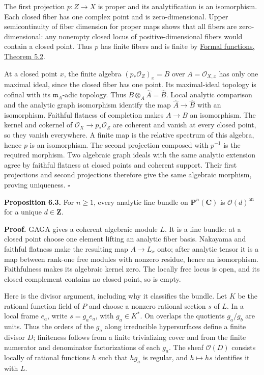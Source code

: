 \documentclass[11pt]{article}
\begin{document}
The first projection \(p:Z\to X\) is proper and its analytification is
an isomorphism. Each closed fiber has one complex point and is
zero-dimensional. Upper semicontinuity of fiber dimension for proper
maps shows that all fibers are zero-dimensional: any nonempty closed
locus of positive-dimensional fibers would contain a closed point. Thus
\(p\) has finite fibers and is finite by
\href{the-theorem-on-formal-functions.html\#5-dimension-and-finiteness-consequences}{Formal
functions, Theorem 5.2}.

At a closed point \(x\), the finite algebra \((p_*\mathcal O_Z)_x=B\)
over \(A=\mathcal O_{X,x}\) has only one maximal ideal, since the closed
fiber has one point. Its maximal-ideal topology is cofinal with its
\(\mathfrak m_A\)-adic topology. Thus
\(B\otimes_A\widehat A=\widehat B\). Local analytic comparison and the
analytic graph isomorphism identify the map \(\widehat A\to\widehat B\)
with an isomorphism. Faithful flatness of completion makes \(A\to B\) an
isomorphism. The kernel and cokernel of
\(\mathcal O_X\to p_*\mathcal O_Z\) are coherent and vanish at every
closed point, so they vanish everywhere. A finite map is the relative
spectrum of this algebra, hence \(p\) is an isomorphism. The second
projection composed with \(p^{-1}\) is the required morphism. Two
algebraic graph ideals with the same analytic extension agree by
faithful flatness at closed points and coherent support. Their first
projections and second projections therefore give the same algebraic
morphism, proving uniqueness. \(\square\)

\textbf{Proposition 6.3.} For \(n\geq1\), every analytic line bundle on
\(\mathbf P^n(\mathbf C)\) is \(\mathcal O(d)^{\mathrm{an}}\) for a
unique \(d\in\mathbf Z\).

\textbf{Proof.} GAGA gives a coherent algebraic module \(L\). It is a
line bundle: at a closed point choose one element lifting an analytic
fiber basis. Nakayama and faithful flatness make the resulting map
\(A\to L_x\) onto; after analytic tensor it is a map between rank-one
free modules with nonzero residue, hence an isomorphism. Faithfulness
makes its algebraic kernel zero. The locally free locus is open, and its
closed complement contains no closed point, so is empty.

Here is the divisor argument, including why it classifies the bundle.
Let \(K\) be the rational function field of \(P\) and choose a nonzero
rational section \(s\) of \(L\). In a local frame \(e_a\), write
\(s=g_a e_a\), with \(g_a\in K^*\). On overlaps the quotients
\(g_a/g_b\) are units. Thus the orders of the \(g_a\) along irreducible
hypersurfaces define a finite divisor \(D\); finiteness follows from a
finite trivializing cover and from the finite numerator and denominator
factorizations of each \(g_a\). The sheaf \(\mathcal O(D)\) consists
locally of rational functions \(h\) such that \(hg_a\) is regular, and
\(h\mapsto hs\) identifies it with \(L\).
\end{document}
